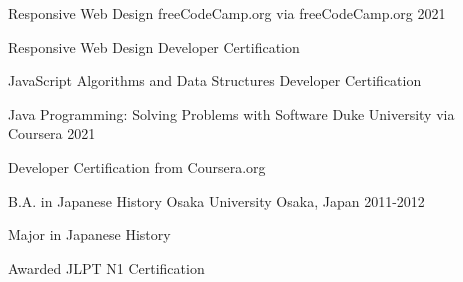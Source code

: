 

\begin{cventries}



    \cventry
        {Responsive Web Design} %
        {freeCodeCamp.org}
        {via freeCodeCamp.org} %
        {2021} %
        {
            \begin{cvitems} %
            \item {Responsive Web Design Developer Certification}
            \item {JavaScript Algorithms and Data Structures Developer Certification}
            \end{cvitems}
        }

    \cventry
        {Java Programming: Solving Problems with Software} %
        {Duke University}
        {via Coursera} %
        {2021} %
        {
            \begin{cvitems} %
            \item {Developer Certification from Coursera.org}
            \end{cvitems}
        }

    \cventry
        {B.A. in Japanese History} %
        {Osaka University} %
        {Osaka, Japan} %
        {2011-2012} %
        {
            \begin{cvitems} %
            \item {Major in Japanese History}
            \item {Awarded JLPT N1 Certification}
            \end{cvitems}
        }


\end{cventries}
